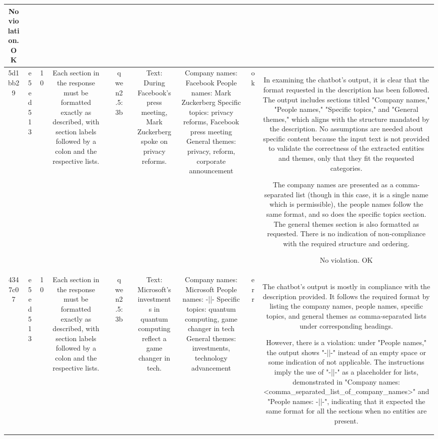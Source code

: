 \begin{table}[h!]
\begin{tabular}{|c|c|c|c|c|c|c|c|c|c|c|}
No violation.
OK\\
\hline
5d1bb29 & e5ed513 & 10 & Each section in the response must be formatted exactly as described, with section labels followed by a colon and the respective lists. &  & qwen2.5:3b &  & Text: During Facebook's press meeting, Mark Zuckerberg spoke on privacy reforms. & Company names: Facebook
People names: Mark Zuckerberg
Specific topics: privacy reforms, Facebook press meeting
General themes: privacy, reform, corporate announcement & ok & In examining the chatbot's output, it is clear that the format requested in the description has been followed. The output includes sections titled "Company names," "People names," "Specific topics," and "General themes," which aligns with the structure mandated by the description. No assumptions are needed about specific content because the input text is not provided to validate the correctness of the extracted entities and themes, only that they fit the requested categories.

The company names are presented as a comma-separated list (though in this case, it is a single name which is permissible), the people names follow the same format, and so does the specific topics section. The general themes section is also formatted as requested. There is no indication of non-compliance with the required structure and ordering.

No violation.
OK\\
\hline
4347c07 & e5ed513 & 10 & Each section in the response must be formatted exactly as described, with section labels followed by a colon and the respective lists. &  & qwen2.5:3b &  & Text: Microsoft's investments in quantum computing reflect a game changer in tech. & Company names: Microsoft
People names: -||-
Specific topics: quantum computing, game changer in tech
General themes: investments, technology advancement & err & The chatbot's output is mostly in compliance with the description provided. It follows the required format by listing the company names, people names, specific topics, and general themes as comma-separated lists under corresponding headings.

However, there is a violation: under "People names," the output shows "-||-" instead of an empty space or some indication of not applicable. The instructions imply the use of "-||-" as a placeholder for lists, demonstrated in "Company names: <comma_separated_list_of_company_names>" and "People names: -||-", indicating that it expected the same format for all the sections when no entities are present.


\end{tabular}
\end{table}
